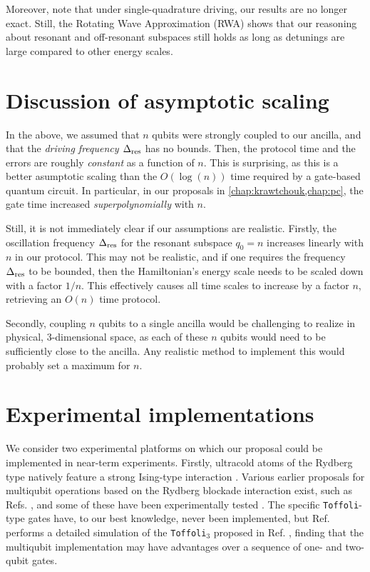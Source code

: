 Moreover, note that under single-quadrature driving, our results are no longer exact. Still, the Rotating Wave Approximation (RWA) shows that our reasoning about resonant and off-resonant subspaces still holds as long as detunings are large compared to other energy scales.


\section{Discussion of asymptotic scaling}
In the above, we assumed that $n$ qubits were strongly coupled to our ancilla, and that the \emph{driving frequency $\Delta_{\text{res}}$} has no bounds. Then, the protocol time and the errors are roughly \emph{constant} as a function of $n$. This is surprising, as this is a better asumptotic scaling than the $O(\log(n))$ time required by a gate-based quantum circuit. In particular, in our proposals in \cref{chap:krawtchouk,chap:pc}, the gate time increased \emph{superpolynomially} with $n$. 

Still, it is not immediately clear if our assumptions are realistic. Firstly, the oscillation frequency $\Delta_{\text{res}}$ for the resonant subspace $q_0 = n$ increases linearly with $n$ in our protocol. This may not be realistic, and if one requires the frequency $\Delta_{\text{res}}$ to be bounded, then the Hamiltonian's energy scale needs to be scaled down with a factor $1/n$. This effectively causes all time scales to increase by a factor $n$, retrieving an $O(n)$ time protocol. 

Secondly, coupling $n$ qubits to a single ancilla would be challenging to realize in physical, 3-dimensional space, as each of these $n$ qubits would need to be sufficiently close to the ancilla.  Any realistic method to implement this would probably set a maximum for $n$. 


\section{Experimental implementations}
We consider two experimental platforms on which our proposal could be implemented in near-term experiments. Firstly, ultracold atoms of the Rydberg type natively feature a strong Ising-type interaction \cite{Saffman2016}. Various earlier proposals for multiqubit operations based on the Rydberg blockade interaction exist, such as Refs. \cite{Lukin2001,Unanyan2002,Isenhower2011,Shi2018}, and some of these have been experimentally tested \cite{Ebert2015,Zeiher2015}. The specific \texttt{Toffoli}-type gates have, to our best knowledge, never been implemented, but Ref. \cite{Gulliksen2015} performs a detailed simulation of the \texttt{Toffoli}$_3$ proposed in Ref. \cite{Isenhower2011}, finding that the multiqubit implementation may have advantages over a sequence of one- and two-qubit gates. 

